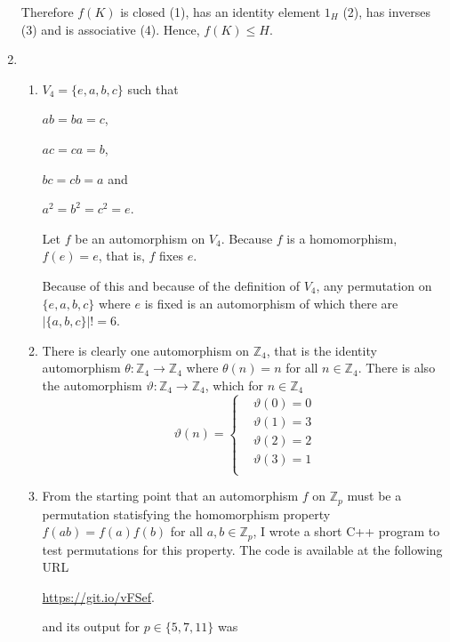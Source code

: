 \documentclass[10pt]{article}
\begin{document}
\begin{enumerate}
      Therefore $f(K)$ is closed (1), has an identity element $1_H$ (2), has
      inverses (3) and is associative (4). Hence, $f(K) \leq H$.
    \item 
      \begin{enumerate}
        \item $V_4 = \{e, a, b, c\}$ such that

          $ab = ba = c$,

          $ac = ca = b$,

          $bc = cb = a$ and

          $a^2 = b^2 = c^2 = e$.

          Let $f$ be an automorphism on $V_4$. Because $f$ is a homomorphism,
          $f(e) = e$, that is, $f$ fixes $e$.

          Because of this and because of the definition of $V_4$, any
          permutation on $\{e, a,b,c\}$ where $e$ is fixed is an automorphism
          of which there are $\Big|\{a,b,c\}\Big|! = 6$.
        \item There is clearly one automorphism on $\mathbb{Z}_4$, that is the
          identity automorphism $\theta : \mathbb{Z}_4 \rightarrow
          \mathbb{Z}_4$ where $\theta(n) = n$ for all $n \in \mathbb{Z}_4$.
          There is also the automorphism $\vartheta : \mathbb{Z}_4
          \rightarrow\mathbb{Z}_4$, which for $n \in \mathbb{Z}_4$
          $$
          \vartheta(n) =
            \begin{cases}
              &\vartheta(0) = 0 \\
              &\vartheta(1) = 3 \\
              &\vartheta(2) = 2 \\
              &\vartheta(3) = 1 \\
            \end{cases}
          $$
        \item From the starting point that an automorphism $f$ on $\mathbb{Z}_p$ must be a permutation statisfying the homomorphism
          property $f(ab) = f(a)f(b)$ for all $a, b \in \mathbb{Z}_p$, I wrote
          a short C++ program to test permutations for this property. The code
          is available at the following URL

          \url{https://git.io/vFSef}.

          and its output for $p \in \{5,7,11\}$ was

          \begin{lstlisting}


\end{lstlisting}
\end{enumerate}
\end{enumerate}
\end{document}
